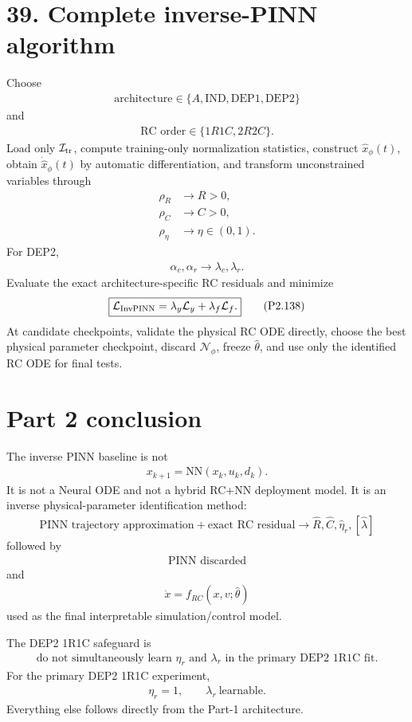 \documentclass[11pt]{article}
\begin{document}
\section*{39. Complete inverse-PINN algorithm}
Choose
\begin{align}
\text{architecture}\in\{A,\mathrm{IND},\mathrm{DEP1},\mathrm{DEP2}\}
\end{align}
and
\begin{align}
\text{RC order}\in\{1R1C,2R2C\}.
\end{align}
Load only \(\mathcal I_{\rm tr}\), compute training-only normalization statistics, construct \(\widehat x_\phi(t)\), obtain \(\dot{\widehat x}_\phi(t)\) by automatic differentiation, and transform unconstrained variables through
\begin{align}
\rho_R&\rightarrow R>0,\\
\rho_C&\rightarrow C>0,\\
\rho_\eta&\rightarrow\eta\in(0,1).
\end{align}
For DEP2,
\begin{align}
\alpha_c,\alpha_r\rightarrow\lambda_c,\lambda_r.
\end{align}
Evaluate the exact architecture-specific RC residuals and minimize
\begin{align}
\boxed{\mathcal L_{\rm InvPINN}=\lambda_y\mathcal L_y+\lambda_f\mathcal L_f.}
\tag{P2.138}
\end{align}
At candidate checkpoints, validate the physical RC ODE directly, choose the best physical parameter checkpoint, discard \(\mathcal N_\phi\), freeze \(\widehat\theta\), and use only the identified RC ODE for final tests.

\section*{Part 2 conclusion}
The inverse PINN baseline is not
\begin{align}
x_{k+1}=\text{NN}(x_k,u_k,d_k).
\end{align}
It is not a Neural ODE and not a hybrid RC+NN deployment model. It is an inverse physical-parameter identification method:
\begin{align}
\boxed{\text{PINN trajectory approximation}+\text{exact RC residual}\longrightarrow\widehat R,\widehat C,\widehat\eta_r,[\widehat\lambda]}
\end{align}
followed by
\begin{align}
\boxed{\text{PINN discarded}}
\end{align}
and
\begin{align}
\boxed{\dot x=f_{RC}(x,v;\widehat\theta)}
\end{align}
used as the final interpretable simulation/control model.

The DEP2 1R1C safeguard is
\begin{align}
\boxed{\text{do not simultaneously learn }\eta_r\text{ and }\lambda_r\text{ in the primary DEP2 1R1C fit}.}
\end{align}
For the primary DEP2 1R1C experiment,
\begin{align}
\boxed{\eta_r=1,\qquad\lambda_r\ \text{learnable}.}
\end{align}
Everything else follows directly from the Part-1 architecture.
\end{document}
